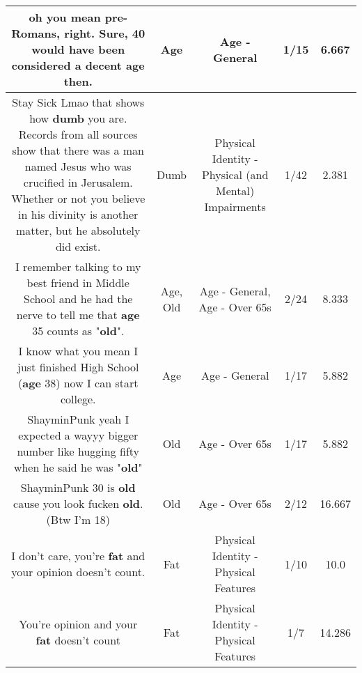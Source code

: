 \documentclass[11pt]{article}
\newlength\mylength
\begin{document}
\begin{center}
\begin{longtable}{|C{.65\mylength}|C{.30\mylength}|C{.12\mylength}|C{.12\mylength}|C{.12\mylength}|}
  \small oh you mean pre-Romans, right. Sure, 40 would have been considered a decent \textbf{age} then.\normalsize   & Age & Age - General & 1/15 & 6.667 \\  \hline
  \small Stay Sick Lmao that shows how \textbf{dumb} you are. Records from all sources show that there was a man named Jesus who was crucified in Jerusalem. Whether or not you believe in his divinity is another matter, but he absolutely did exist.\normalsize   & Dumb & Physical Identity - Physical (and Mental) Impairments & 1/42 & 2.381 \\  \hline
  \small I remember talking to my best friend in Middle School and he had the nerve to tell me that \textbf{age} 35 counts as "\textbf{old}".\normalsize   & Age, Old & Age - General, Age - Over 65s & 2/24 & 8.333 \\  \hline
  \small I know what you mean I just finished High School (\textbf{age} 38) now I can start college.\normalsize   & Age & Age - General & 1/17 & 5.882 \\  \hline
  \small ShayminPunk yeah I expected a wayyy bigger number like hugging fifty when he said he was "\textbf{old}"\normalsize   & Old & Age - Over 65s & 1/17 & 5.882 \\  \hline
  \small ShayminPunk 30 is \textbf{old} cause you look fucken \textbf{old}. (Btw I'm 18)\normalsize   & Old & Age - Over 65s & 2/12 & 16.667 \\  \hline
  \small I don't care, you're \textbf{fat} and your opinion doesn't count.\normalsize   & Fat & Physical Identity - Physical Features & 1/10 & 10.0 \\  \hline
  \small You're opinion and your \textbf{fat} doesn't count\normalsize   & Fat & Physical Identity - Physical Features & 1/7 & 14.286 \\  \hline

\end{longtable}
\end{center}
\end{document}
